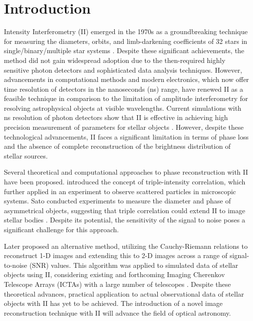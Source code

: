 \section{Introduction}

Intensity Interferometry (II) emerged in the 1970s as a groundbreaking technique for measuring the diameters, orbits, and limb-darkening coefficients of 32 stars in single/binary/multiple star systems \cite{brown1974intensity}. Despite these significant achievements, the method did not gain widespread adoption due to the then-required highly sensitive photon detectors and sophisticated data analysis techniques. However, advancements in computational methods and modern electronics, which now offer time resolution of detectors in the nanoseconds (ns) range, have renewed II as a feasible technique in comparison to the limitation of amplitude interferometry for resolving astrophysical objects at visible wavelengths. Current simulations with ns resolution of photon detectors show that II is effective in achieving high precision measurement of parameters for stellar objects \citep{10.1093/mnras/stab2391, 10.1093/mnras/stac2433}. However, despite these technological advancements, II faces a significant limitation in terms of phase loss and the absence of complete reconstruction of the brightness distribution of stellar sources.

Several theoretical and computational approaches to phase reconstruction with II have been proposed. \cite{gamo1963triple} introduced the concept of triple-intensity correlation, which \cite{goldberger1963use} further applied in an experiment to observe scattered particles in microscopic systems. Sato conducted experiments to measure the diameter and phase of asymmetrical objects, suggesting that triple correlation could extend II to image stellar bodies \citep{sato1978imaging, sato1979computer, sato1981adaptive}. Despite its potential, the sensitivity of the signal to noise poses a significant challenge for this approach.

Later \cite{holmes2010two} proposed an alternative method, utilizing the Cauchy-Riemann relations to reconstruct 1-D images and extending this to 2-D images across a range of signal-to-noise (SNR) values. This algorithm was applied to simulated data of stellar objects using II, considering existing and forthcoming Imaging Cherenkov Telescope Arrays (ICTAs) with a large number of telescopes \citep{nunez2010stellar, nunez2012high, nunez2012imaging}. Despite these theoretical advances, practical application to actual observational data of stellar objects with II has yet to be achieved. The introduction of a novel image reconstruction technique with II will advance the field of optical astronomy.


